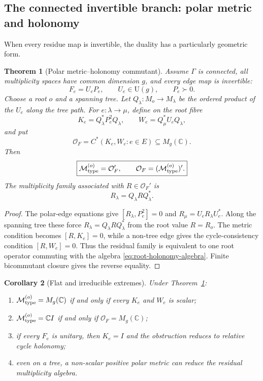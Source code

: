 \documentclass[11pt]{article}
\newtheorem{theorem}{Theorem}[section]
\newtheorem{corollary}[theorem]{Corollary}
\theoremstyle{definition}
\theoremstyle{remark}
\newcommand{\C}{\mathbb C}
\newcommand{\U}{\mathrm U}
\newcommand{\M}{\mathcal M}
\newcommand{\Oalg}{\mathcal O}
\begin{document}
\subsection{The connected invertible branch: polar metric and holonomy}

When every residue map is invertible, the duality has a particularly geometric
form.

\begin{theorem}[Polar metric--holonomy commutant]
\label{thm:polar-holonomy}
Assume $\Gamma$ is connected, all multiplicity spaces have common dimension
$g$, and every edge map is invertible:
\[
F_e=U_eP_e,
\qquad
U_e\in\U(g),
\qquad
P_e\succ0.
\]
Choose a root $o$ and a spanning tree.  Let
$Q_\lambda:M_o\to M_\lambda$ be the ordered product of the $U_e$ along the
tree path.  For $e:\lambda\to\mu$, define on the root fibre
\[
K_e=Q_\lambda^*P_e^2Q_\lambda,
\qquad
W_e=Q_\mu^*U_eQ_\lambda,
\]
and put
\begin{equation}
\boxed{
\Oalg_F
=
C^*(K_e,W_e:e\in E)\subseteq M_g(\C).}
\label{eq:root-holonomy-algebra}
\end{equation}
Then
\begin{equation}
\boxed{
\M_{\rm type}^{(o)}
=
\Oalg_F',
\qquad
\Oalg_F
=
(\M_{\rm type}^{(o)})'.}
\label{eq:root-holonomy-duality}
\end{equation}
The multiplicity family associated with
$R\in\Oalg_F'$ is
\[
R_\lambda=Q_\lambda RQ_\lambda^*.
\]
\end{theorem}

\begin{proof}
The polar-edge equations give
$[R_\lambda,P_e^2]=0$ and
$R_\mu=U_eR_\lambda U_e^*$.
Along the spanning tree these force
$R_\lambda=Q_\lambda RQ_\lambda^*$ from the root value $R=R_o$.
The metric condition becomes $[R,K_e]=0$, while a non-tree edge gives the
cycle-consistency condition $[R,W_e]=0$.  Thus the residual family is
equivalent to one root operator commuting with the algebra
\eqref{eq:root-holonomy-algebra}.  Finite bicommutant closure gives the reverse
equality.
\end{proof}

\begin{corollary}[Flat and irreducible extremes]
\label{cor:polar-extremes}
Under Theorem~\ref{thm:polar-holonomy}:
\begin{enumerate}[label=\textup{(\roman*)},leftmargin=2.8em]
\item $\M_{\rm type}^{(o)}=M_g(\C)$ if and only if every $K_e$ and $W_e$ is
      scalar;
\item $\M_{\rm type}^{(o)}=\C I$ if and only if $\Oalg_F=M_g(\C)$;
\item if every $F_e$ is unitary, then $K_e=I$ and the obstruction reduces to
      relative cycle holonomy;
\item even on a tree, a non-scalar positive polar metric can reduce the
      residual multiplicity algebra.
\end{enumerate}
\end{corollary}
\end{document}
